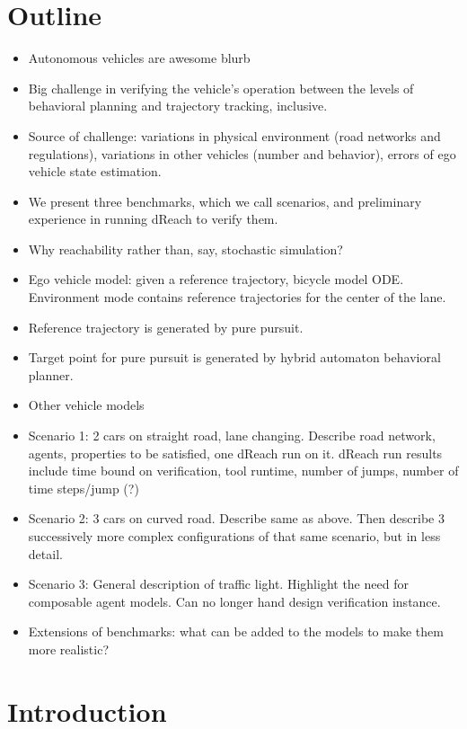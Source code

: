 \documentclass{easychair}
\theoremstyle{theorem}
\theoremstyle{remark}
\begin{document}
\section{Outline}
\begin{itemize}
\item Autonomous vehicles are awesome blurb

\item Big challenge in verifying the vehicle's operation between the levels of behavioral planning and trajectory tracking, inclusive. 
\item Source of challenge: variations in physical environment (road networks and regulations), variations in other vehicles (number and behavior), errors of ego vehicle state estimation.
\item We present three benchmarks, which we call scenarios, and preliminary experience in running dReach to verify them.
\item Why reachability rather than, say, stochastic simulation?
\item Ego vehicle model: given a reference trajectory, bicycle model ODE. Environment mode contains reference trajectories for the center of the lane. 
\item Reference trajectory is generated by pure pursuit. 
\item Target point for pure pursuit is generated by hybrid automaton behavioral planner.
\item Other vehicle models
\item Scenario 1: 2 cars on straight road, lane changing.
Describe road network, agents, properties to be satisfied, one dReach run on it.
dReach run results include time bound on verification, tool runtime, number of jumps, number of time steps/jump (?)
\item Scenario 2: 3 cars on curved road. 
Describe same as above.
Then describe 3 successively more complex configurations of that same scenario, but in less detail.
\item Scenario 3: General description of traffic light. Highlight the need for composable agent models. Can no longer hand design verification instance. 
\item Extensions of benchmarks: what can be added to the models to make them more realistic?
\end{itemize}

\section{Introduction}
\label{sect:introduction}
\end{document}
